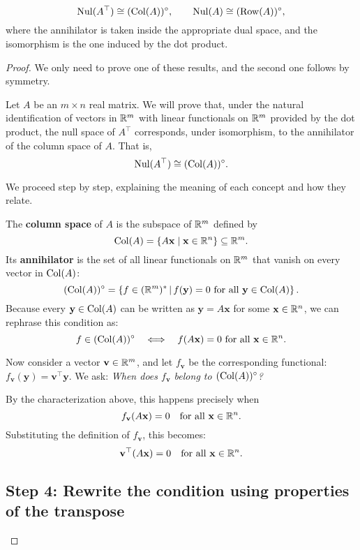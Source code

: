 \begin{theorem} 
\[
\operatorname{Nul}(A^\top) \cong (\operatorname{Col}(A))^\circ, \qquad
\operatorname{Nul}(A) \cong (\operatorname{Row}(A))^\circ,
\]
where the annihilator is taken inside the appropriate dual space, and the isomorphism is the one induced by the dot product.
\begin{proof}
\medskip

We only need to prove one of these results, and the second one follows by symmetry.

Let $A$ be an $m \times n$ real matrix. We will prove that, under the natural identification of vectors in $\mathbb{R}^m$ with linear functionals on $\mathbb{R}^m$ provided by the dot product, the null space of $A^\top$ corresponds, under isomorphism, to the annihilator of the column space of $A$. That is,
\[
\operatorname{Nul}(A^\top) \cong (\operatorname{Col}(A))^\circ.
\]

We proceed step by step, explaining the meaning of each concept and how they relate.


The \textbf{column space} of $A$ is the subspace of $\mathbb{R}^m$ defined by
\[
\operatorname{Col}(A) = \{ A\mathbf{x} \mid \mathbf{x} \in \mathbb{R}^n \} \subseteq \mathbb{R}^m.
\]
Its \textbf{annihilator} is the set of all linear functionals on $\mathbb{R}^m$ that vanish on every vector in $\operatorname{Col}(A)$:
\[
(\operatorname{Col}(A))^\circ = \left\{ f \in (\mathbb{R}^m)^* \,\middle|\, f(\mathbf{y}) = 0 \text{ for all } \mathbf{y} \in \operatorname{Col}(A) \right\}.
\]
Because every $\mathbf{y} \in \operatorname{Col}(A)$ can be written as $\mathbf{y} = A\mathbf{x}$ for some $\mathbf{x} \in \mathbb{R}^n$, we can rephrase this condition as:
\[
f \in (\operatorname{Col}(A))^\circ \quad \Longleftrightarrow \quad f(A\mathbf{x}) = 0 \text{ for all } \mathbf{x} \in \mathbb{R}^n.
\]

Now consider a vector $\mathbf{v} \in \mathbb{R}^m$, and let $f_{\mathbf{v}}$ be the corresponding functional: $f_{\mathbf{v}}(\mathbf{y}) = \mathbf{v}^\top \mathbf{y}$.  
We ask: \textit{When does $f_{\mathbf{v}}$ belong to $(\operatorname{Col}(A))^\circ$?}

By the characterization above, this happens precisely when
\[
f_{\mathbf{v}}(A\mathbf{x}) = 0 \quad \text{for all } \mathbf{x} \in \mathbb{R}^n.
\]
Substituting the definition of $f_{\mathbf{v}}$, this becomes:
\begin{equation}
\label{eq:annihilator-condition}
\mathbf{v}^\top (A\mathbf{x}) = 0 \quad \text{for all } \mathbf{x} \in \mathbb{R}^n.
\end{equation}

\subsection*{Step 4: Rewrite the condition using properties of the transpose}


\end{proof}
\end{theorem}
